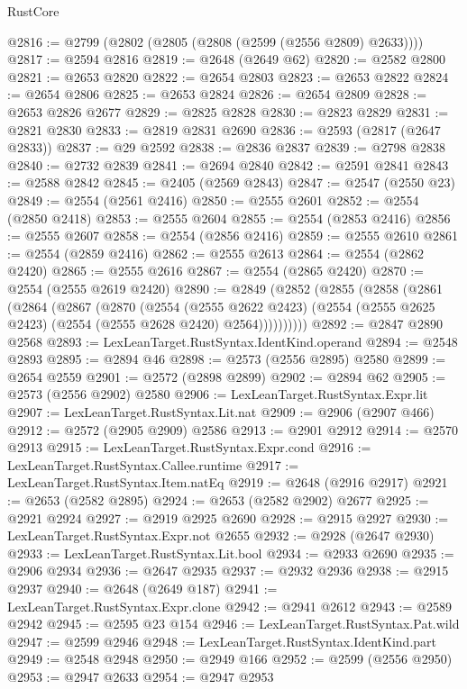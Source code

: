 \begin{lexlean}{RustCore}
\begin{coremodule}
@2816 := @2799 (@2802 (@2805 (@2808 (@2599 (@2556 @2809) @2633))))
@2817 := @2594 @2816
@2819 := @2648 (@2649 @62)
@2820 := @2582 @2800
@2821 := @2653 @2820
@2822 := @2654 @2803
@2823 := @2653 @2822
@2824 := @2654 @2806
@2825 := @2653 @2824
@2826 := @2654 @2809
@2828 := @2653 @2826 @2677
@2829 := @2825 @2828
@2830 := @2823 @2829
@2831 := @2821 @2830
@2833 := @2819 @2831 @2690
@2836 := @2593 (@2817 (@2647 @2833))
@2837 := @29 @2592
@2838 := @2836 @2837
@2839 := @2798 @2838
@2840 := @2732 @2839
@2841 := @2694 @2840
@2842 := @2591 @2841
@2843 := @2588 @2842
@2845 := @2405 (@2569 @2843)
@2847 := @2547 (@2550 @23)
@2849 := @2554 (@2561 @2416)
@2850 := @2555 @2601
@2852 := @2554 (@2850 @2418)
@2853 := @2555 @2604
@2855 := @2554 (@2853 @2416)
@2856 := @2555 @2607
@2858 := @2554 (@2856 @2416)
@2859 := @2555 @2610
@2861 := @2554 (@2859 @2416)
@2862 := @2555 @2613
@2864 := @2554 (@2862 @2420)
@2865 := @2555 @2616
@2867 := @2554 (@2865 @2420)
@2870 := @2554 (@2555 @2619 @2420)
@2890 := @2849
    (@2852
      (@2855
        (@2858
          (@2861
            (@2864
              (@2867
                (@2870
                  (@2554
                    (@2555 @2622 @2423)
                    (@2554 (@2555 @2625 @2423) (@2554 (@2555 @2628 @2420) @2564))))))))))
@2892 := @2847 @2890 @2568
@2893 := LexLeanTarget.RustSyntax.IdentKind.operand
@2894 := @2548 @2893
@2895 := @2894 @46
@2898 := @2573 (@2556 @2895) @2580
@2899 := @2654 @2559
@2901 := @2572 (@2898 @2899)
@2902 := @2894 @62
@2905 := @2573 (@2556 @2902) @2580
@2906 := LexLeanTarget.RustSyntax.Expr.lit
@2907 := LexLeanTarget.RustSyntax.Lit.nat
@2909 := @2906 (@2907 @466)
@2912 := @2572 (@2905 @2909) @2586
@2913 := @2901 @2912
@2914 := @2570 @2913
@2915 := LexLeanTarget.RustSyntax.Expr.cond
@2916 := LexLeanTarget.RustSyntax.Callee.runtime
@2917 := LexLeanTarget.RustSyntax.Item.natEq
@2919 := @2648 (@2916 @2917)
@2921 := @2653 (@2582 @2895)
@2924 := @2653 (@2582 @2902) @2677
@2925 := @2921 @2924
@2927 := @2919 @2925 @2690
@2928 := @2915 @2927
@2930 := LexLeanTarget.RustSyntax.Expr.not @2655
@2932 := @2928 (@2647 @2930)
@2933 := LexLeanTarget.RustSyntax.Lit.bool
@2934 := @2933 @2690
@2935 := @2906 @2934
@2936 := @2647 @2935
@2937 := @2932 @2936
@2938 := @2915 @2937
@2940 := @2648 (@2649 @187)
@2941 := LexLeanTarget.RustSyntax.Expr.clone
@2942 := @2941 @2612
@2943 := @2589 @2942
@2945 := @2595 @23 @154
@2946 := LexLeanTarget.RustSyntax.Pat.wild
@2947 := @2599 @2946
@2948 := LexLeanTarget.RustSyntax.IdentKind.part
@2949 := @2548 @2948
@2950 := @2949 @166
@2952 := @2599 (@2556 @2950)
@2953 := @2947 @2633
@2954 := @2947 @2953

\end{coremodule}
\end{lexlean}

